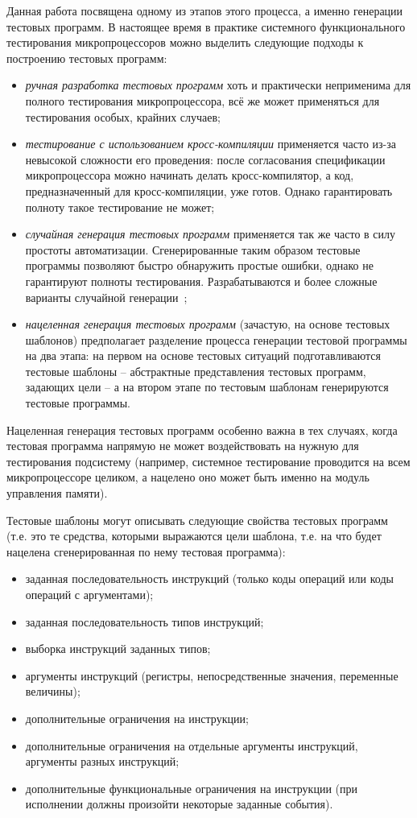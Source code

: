 Данная работа посвящена одному из этапов этого процесса, а именно
генерации тестовых программ. В настоящее время в практике системного
функционального тестирования микропроцессоров можно выделить
следующие подходы к построению тестовых программ:
\begin{itemize}
\item \emph{ручная разработка тестовых программ} хоть и практически неприменима
для полного тестирования микропроцессора, всё же может применяться
для тестирования особых, крайних случаев;
\item \emph{тестирование с использованием кросс-компиляции} применяется часто
из-за невысокой сложности его проведения: после согласования
спецификации микропроцессора можно начинать делать кросс-компилятор,
а код, предназначенный для кросс-компиляции, уже готов. Однако
гарантировать полноту такое тестирование не может;
\item \emph{случайная генерация тестовых программ} применяется так же часто в
силу простоты автоматизации. Сгенерированные таким образом тестовые
программы позволяют быстро обнаружить простые ошибки, однако не
гарантируют полноты тестирования. Разрабатываются и более сложные
варианты случайной генерации~\cite{muGP};
\item \emph{нацеленная генерация тестовых программ} (зачастую, на основе тестовых
шаблонов) предполагает разделение процесса генерации тестовой
программы на два этапа: на первом на основе тестовых ситуаций
подготавливаются тестовые шаблоны -- абстрактные представления
тестовых программ, задающих цели -- а на втором этапе по тестовым
шаблонам генерируются тестовые программы.
\end{itemize}

Нацеленная генерация тестовых программ особенно важна в тех случаях,
когда тестовая программа напрямую не может воздействовать на нужную
для тестирования подсистему (например, системное тестирование
проводится на всем микропроцессоре целиком, а нацелено оно может
быть именно на модуль управления памяти).

Тестовые шаблоны могут описывать следующие свойства тестовых
программ (т.е. это те средства, которыми выражаются цели шаблона,
т.е. на что будет нацелена сгенерированная по нему тестовая
программа):
\begin{itemize}
\item заданная последовательность инструкций (только коды операций или
коды операций с аргументами);
\item заданная последовательность типов инструкций;
\item выборка инструкций заданных типов;
\item аргументы инструкций (регистры, непосредственные
значения, переменные величины);
\item дополнительные ограничения на инструкции;
\item дополнительные ограничения на отдельные аргументы инструкций,
аргументы разных инструкций;
\item дополнительные функциональные ограничения на инструкции (при
исполнении должны произойти некоторые заданные события).
\end{itemize}

